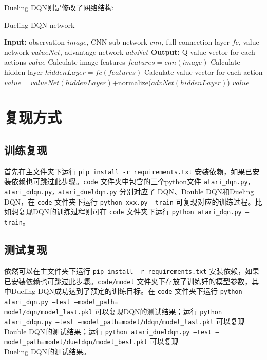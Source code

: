 \documentclass[a4paper,12pt]{article}
\begin{document}
\begin{CJK}{UTF8}{gbsn}
\newpage
\noindent Dueling DQN则是修改了网络结构:
\begin{algorithm}[!h]
	\caption{Dueling DQN network}
	\begin{algorithmic}[1]
		\STATE \textbf{Input:} observation $image$, CNN sub-network $cnn$, full connection layer  $fc$, value network $valueNet$, advantage network $advNet$
		\STATE \textbf{Output:} Q value vector for each actions $value$
		\STATE Calculate image features $features=cnn(image)$
		\STATE Calculate hidden layer $hiddenLayer=fc(features)$
		\STATE Calculate value vector for each action \\$value=valueNet(hiddenLayer)$+normalize($advNet(hiddenLayer)$)
		\RETURN $value$
	\end{algorithmic}
\end{algorithm}
\section{复现方式}
\subsection{训练复现}
\noindent 首先在主文件夹下运行 \texttt{pip install -r requirements.txt} 安装依赖，如果已安装依赖也可跳过此步骤。\texttt{code} 文件夹中包含的三个python文件 \texttt{atari\_dqn.py，atari\_ddqn.py，atari\_dueldqn.py} 分别对应了 DQN、Double DQN和Dueling DQN，在 \texttt{code} 文件夹下运行 \texttt{python xxx.py --train} 可复现对应的训练过程。比如想复现DQN的训练过程则可在 \texttt{code} 文件夹下运行 \texttt{python atari\_dqn.py --train}。
\subsection{测试复现}
\noindent 依然可以在主文件夹下运行 \texttt{pip install -r requirements.txt} 安装依赖，如果已安装依赖也可跳过此步骤。\texttt{code/model} 文件夹下存放了训练好的模型参数，其中Dueling DQN成功达到了预定的训练目标。在 \texttt{code} 文件夹下运行 \texttt{python atari\_dqn.py --test --model\_path=\\model/dqn/model\_last.pkl} 可以复现DQN的测试结果；运行 \texttt{python atari\_ddqn.py --test --model\_path=model/ddqn/model\_last.pkl} 可以复现Double DQN的测试结果；运行 \texttt{python atari\_dueldqn.py --test --model\_path=model/dueldqn/model\_best.pkl} 可以复现\\Dueling DQN的测试结果。

\end{CJK}
\end{document}
